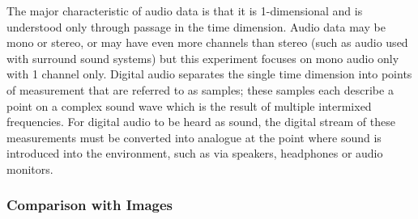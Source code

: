 \documentclass[a4paper, titlepage]{article}
\begin{document}
The major characteristic of audio data is that it is 1-dimensional and is understood only through passage in the time dimension.
Audio data may be mono or stereo, or may have even more channels than stereo (such as audio used with surround sound systems) but this experiment focuses on mono audio only with 1 channel only.
\newline
\newline
Digital audio separates the single time dimension into points of measurement that are referred to as samples; these samples each describe a point on a complex sound wave which is the result of multiple intermixed frequencies.
For digital audio to be heard as sound, the digital stream of these measurements must be converted into analogue at the point where sound is introduced into the environment, such as via speakers, headphones or audio monitors.

\subsubsection{Comparison with Images}
\end{document}
